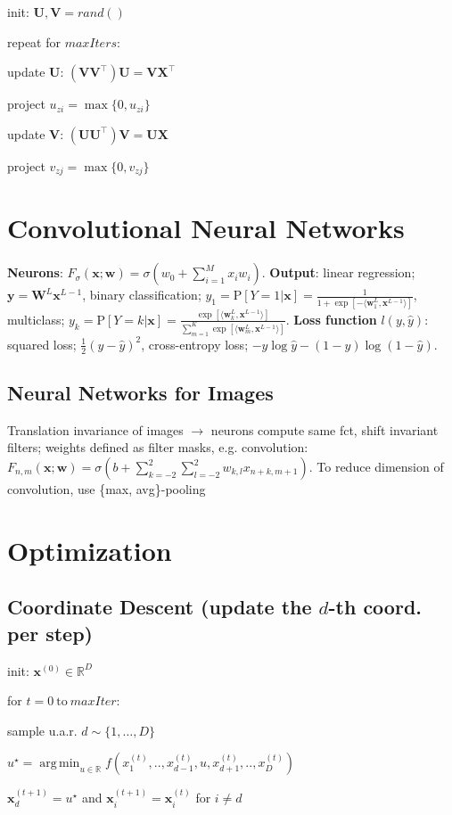 \documentclass[a4paper, 11pt, landscape]{article}
\newenvironment{inlinelist}%
{\begin{enumerate*}[label=\textbf{\color{red}\theenumi.}]}%
{\end{enumerate*}}
\DeclareMathOperator*{\argmin}{arg\,min}
\begin{document}
\begin{multicols*}{3}
\begin{inlinelist}
	\item init: $\mathbf{U}, \mathbf{V} = rand()$
	\item repeat for $\mathit{maxIters}$:
	\item update $\mathbf{U}$: $(\mathbf{VV}^\top)\mathbf{U} = \mathbf{VX}^\top$
	\item project $u_{zi} = \max \{ 0, u_{zi} \}$
	\item update $\mathbf{V}$: $(\mathbf{UU}^\top)\mathbf{V} = \mathbf{UX}$
	\item project $v_{zj} = \max \{ 0, v_{zj} \}$
\end{inlinelist}

\section{Convolutional Neural Networks}
\textbf{Neurons}: $F_\sigma(\mathbf{x};\mathbf{w}) = \sigma(w_0 + \sum_{i=1}^M{x_iw_i})$. \textbf{Output}: linear regression; $\mathbf{y} = \mathbf{W}^L\mathbf{x}^{L-1}$, binary classification; $y_1 = \text{P}[Y=1|\mathbf{x}] = \frac{1}{1 + \exp[-\langle \mathbf{w}_1^L,\mathbf{x}^{L-1}\rangle]}$, multiclass; $y_k = \text{P}[Y=k|\mathbf{x}]= \frac{\exp[\langle \mathbf{w}_k^L,\mathbf{x}^{L-1}\rangle]}{\sum_{m=1}^{K}{\exp[\langle \mathbf{w}_m^L, \mathbf{x}^{L-1}\rangle]}}$. \textbf{Loss function} $l(y, \hat{y})$: squared loss; $\frac{1}{2}(y - \hat{y})^2$, cross-entropy loss; $-y \log \hat{y} - (1-y)\log(1-\hat{y})$.

\subsection{Neural Networks for Images}
Translation invariance of images $\rightarrow$ neurons compute same fct, shift invariant filters; weights defined as filter masks, e.g. convolution: $F_{n,m}(\mathbf{x};\mathbf{w}) = \sigma(b + \sum_{k=-2}^2\sum_{l=-2}^{2}{w_{k,l}x_{n+k,m+1}})$. To reduce dimension of convolution, use \{max, avg\}-pooling 

\section{Optimization}

\subsection{Coordinate Descent (update the $d$-th coord. per step)}
\begin{inlinelist}
	\item init: $\mathbf{x}^{(0)} \in \mathbb{R}^D$
	\item for $t = 0 \ \text{to} \ \mathit{maxIter}$:
	\item sample u.a.r. $d \sim \{1, \ldots, D\}$
	\item $u^\star = \argmin_{u \in \mathbb{R}} f(x_1^{(t)}, .., x_{d-1}^{(t)}, u, x_{d+1}^{(t)}, .., x_D^{(t)})$
	\item $\mathbf{x}_d^{(t+1)} = u^\star$ and $\mathbf{x}_i^{(t+1)} = \mathbf{x}_i^{(t)}$ for $i \neq d$
\end{inlinelist}


\end{multicols*}
\end{document}
